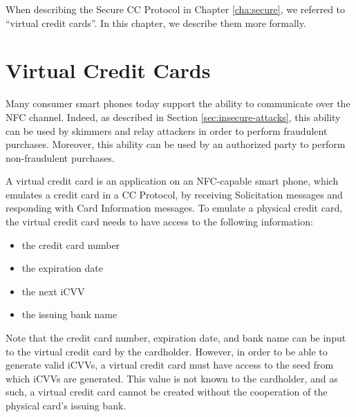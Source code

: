 When describing the Secure CC Protocol in Chapter \ref{cha:secure}, we referred to ``virtual credit cards''.
In this chapter, we describe them more formally.

\section{Virtual Credit Cards}

Many consumer smart phones today support the ability to communicate over the NFC channel.
Indeed, as described in Section \ref{sec:insecure-attacks}, this ability can be used by skimmers and relay attackers in order to perform fraudulent purchases.
Moreover, this ability can be used by an authorized party to perform non-fraudulent purchases.

A virtual credit card is an application on an NFC-capable smart phone, which emulates a credit card in a CC Protocol,
    by receiving Solicitation messages and responding with Card Information messages.
To emulate a physical credit card, the virtual credit card needs to have access to the following information:

\begin{itemize}
\item the credit card number
\item the expiration date
\item the next iCVV
\item the issuing bank name
\end{itemize}

Note that the credit card number, expiration date, and bank name can be input to the virtual credit card by the cardholder.
However, in order to be able to generate valid iCVVs, a virtual credit card must have access to the seed from which iCVVs are generated.
This value is not known to the cardholder, and as such, a virtual credit card cannot be created without the cooperation of the physical card's issuing bank.


